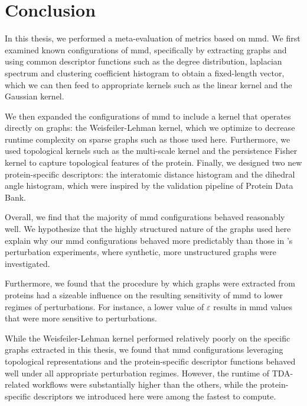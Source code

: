 \chapter{Conclusion}\label{chap:conclusion}

In this thesis, we performed a meta-evaluation of metrics based on \acrshort{mmd}. We first
examined known configurations of \acrshort{mmd}, specifically by extracting graphs and
using common descriptor functions such as the degree distribution, laplacian
spectrum and clustering coefficient histogram to obtain a fixed-length vector,
which we can then feed to appropriate kernels such as the linear kernel and the
Gaussian kernel.

We then expanded the configurations of \acrshort{mmd} to include a kernel that operates
directly on graphs: the Weisfeiler-Lehman kernel, which we optimize to decrease
runtime complexity on sparse graphs such as those used here. Furthermore, we
used topological kernels such as the multi-scale kernel and the persistence
Fisher kernel to capture topological features of the protein. Finally, we
designed two new protein-specific descriptors: the interatomic distance
histogram and the dihedral angle histogram, which were inspired by the
validation pipeline of Protein Data Bank.

Overall, we find that the majority of \acrshort{mmd} configurations behaved reasonably
well. We hypothesize that the highly structured nature of the graphs used here
explain why our \acrshort{mmd} configurations behaved more predictably than those
in \cite{o2021evaluation}'s perturbation experiments, where synthetic, more
unstructured graphs were investigated.

Furthermore, we found that the procedure by which graphs were extracted from
proteins had a sizeable influence on the resulting sensitivity of \acrshort{mmd} to lower
regimes of perturbations. For instance, a lower value of $\varepsilon$ results
in \acrshort{mmd} values that were more sensitive to perturbations.

While the Weisfeiler-Lehman kernel performed relatively poorly on the specific
graphs extracted in this thesis, we found that \acrshort{mmd} configurations leveraging
topological representations and the protein-specific descriptor functions
behaved well under all appropriate perturbation regimes. However, the runtime of
TDA-related workflows were substantially higher than the others, while the
protein-specific descriptors we introduced here were among the fastest to
compute.

